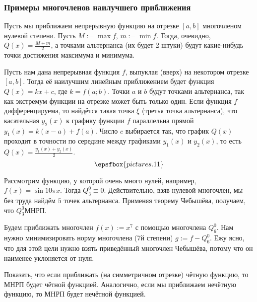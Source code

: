 \documentclass[a4paper]{article}
\begin{document}
\subsubsection{Примеры многочленов наилучшего приближения}

\begin{ex}
Пусть мы приближаем непрерывную функцию на отрезке $[a,b]$ многочленом нулевой степени. Пусть $M:= \max f$, $m := \min f$.
Тогда, очевидно, $Q(x) = \frac{M+m}{2}$, а точками альтернанса (их будет 2 штуки) будут какие-нибудь точки достижения максимума
и минимума.
\end{ex}

\begin{ex}
Пусть нам дана непрерывная функция $f$, выпуклая (вверх) на некотором отрезке $[a,b]$. Тогда её наилучшим линейным
приближением будет функция $Q(x)= kx+c$, где $k = f(a;b)$. Точки $a$ и $b$ будут точками альтернанса, так как экстремум
функции на отрезке может быть только один. Если функция $f$ дифференцируема, то найдётся такая  точка $\xi$
(третья точка альтернанса), что касательная $y_2(x)$ к графику функции $f$ параллельна прямой $y_1(x) = k(x-a)+f(a)$.
Число $c$ выбирается так, что график $Q(x)$ проходит в точности по середине между графиками $y_1(x)$ и $y_2(x)$,
то есть $Q(x) = \frac{y_1(x)+y_2(x)}{2}$.
$$\epsfbox{pictures.11}$$
\end{ex}

\begin{ex}
Рассмотрим функцию, у которой очень много нулей, например, $f(x) = \sin 10\pi x$.
Тогда $Q_3^0 \equiv 0$. Действительно, взяв нулевой многочлен, мы без труда найдём $5$ точек
альтернанса. Применяя теорему Чебышёва, получаем, что $Q_3^0$\т МНРП.
\end{ex}

\begin{ex}
Будем приближать многочлен $f(x) := x^7$ с помощью многочлена $Q_6^0$. Нам нужно минимизировать
норму многочлена (7\д й степени) $g := f- Q_6^0$. Ежу ясно, что для этой цели нужно
взять приведённый многочлен Чебышёва, потому что он наименее уклоняется от нуля.
\end{ex}

\begin{problem}
Показать, что если приближать (на симметричном отрезке) чётную функцию,
то МНРП будет чётной функцией. Аналогично, если мы приближаем нечётную функцию,
то МНРП будет нечётной функцией.
\end{problem}
\end{document}
